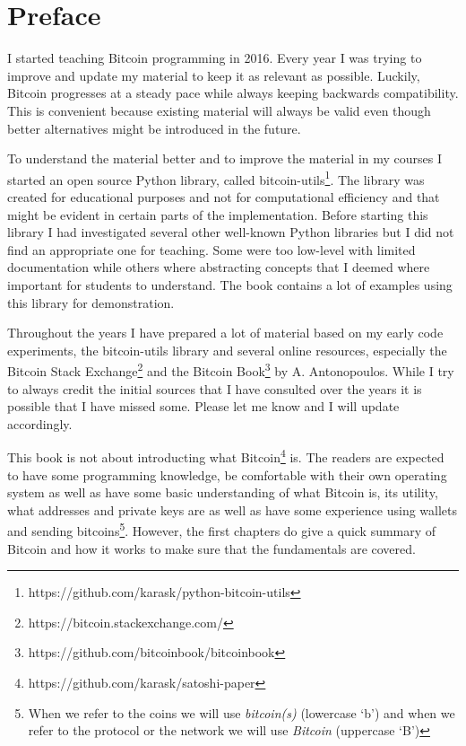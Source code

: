 
\section{Preface}
I started teaching Bitcoin programming in 2016. Every year I was trying to improve and update my material to keep it as relevant as possible. Luckily, Bitcoin progresses at a steady pace while always keeping backwards compatibility. This is convenient because existing material will always be valid even though better alternatives might be introduced in the future.

To understand the material better and to improve the material in my courses I started an open source Python library, called bitcoin-utils\footnote{https://github.com/karask/python-bitcoin-utils}. The library was created for educational purposes and not for computational efficiency and that might be evident in certain parts of the implementation. Before starting this library I had investigated several other well-known Python libraries but I did not find an appropriate one for teaching. Some were too low-level with limited documentation while others where abstracting concepts that I deemed where important for students to understand. The book contains a lot of examples using this library for demonstration.

Throughout the years I have prepared a lot of material based on my early code experiments, the bitcoin-utils library and several online resources, especially the Bitcoin Stack Exchange\footnote{https://bitcoin.stackexchange.com/} and the Bitcoin Book\footnote{https://github.com/bitcoinbook/bitcoinbook} by A. Antonopoulos. While I try to always credit the initial sources that I have consulted over the years it is possible that I have missed some. Please let me know and I will update accordingly.

This book is not about introducting what Bitcoin\footnote{https://github.com/karask/satoshi-paper} is. The readers are expected to have some programming knowledge, be comfortable with their own operating system as well as have some basic understanding of what Bitcoin is, its utility, what addresses and private keys are as well as have some experience using wallets and sending bitcoins\footnote{When we refer to the coins we will use \emph{bitcoin(s)} (lowercase `b') and when we refer to the protocol or the network we will use \emph{Bitcoin} (uppercase `B')}. However, the first chapters do give a quick summary of Bitcoin and how it works to make sure that the fundamentals are covered.

